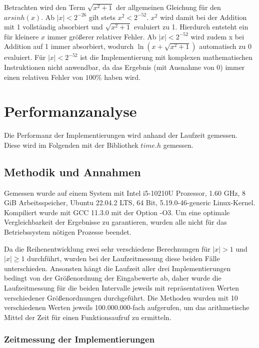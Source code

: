 \documentclass[course=erap] {aspdoc}
\begin{document}
    Betrachten wird den Term $\sqrt{x^2 + 1}$ der allgemeinen Gleichung für den $arsinh(x)$.
    Ab $|x|<2^{-26}$ gilt stets $x^2<2^{-52}$. $x^2$ wird damit bei der Addition mit 1 vollständig absorbiert und $\sqrt{x^2 + 1}$ evaluiert zu 1.
    Hierdurch entsteht ein für kleinere $x$ immer größerer relativer Fehler.
    Ab $|x|<2^{-52}$ wird zudem x bei Addition auf 1 immer absorbiert, wodurch $\ln{(x+\sqrt{x^2 + 1})}$ automatisch zu 0 evaluiert.
    Für $|x|<2^{-52}$ ist die Implementierung mit komplexen mathematischen Instruktionen nicht anwendbar, da das Ergebnis (mit Ausnahme von 0) immer einen relativen Fehler von $100\%$ haben wird.


    \section{Performanzanalyse}\label{sec:performanzanalyse}
    
    Die Performanz der Implementierungen wird anhand der Laufzeit gemessen.
    Diese wird im Folgenden mit der Bibliothek $time.h$ gemessen.

    \subsection{Methodik und Annahmen}\label{subsec:methodik-und-annahmen}
    
    Gemessen wurde auf einem System mit Intel i5-10210U Prozessor, 1.60 GHz, 8 GiB Arbeitsspeicher, Ubuntu 22.04.2 LTS, 64 Bit, 5.19.0-46-generic Linux-Kernel.
    Kompiliert wurde mit GCC 11.3.0 mit der Option -O3. Um eine optimale Vergleichbarkeit der Ergebnisse zu garantieren, wurden alle nicht für das Betriebssystem nötigen Prozesse beendet.

    Da die Reihenentwicklung zwei sehr verschiedene Berechnungen für $|x|>1$ und $|x|\geq 1$ durchführt, wurden bei der Laufzeitmessung diese beiden Fälle unterschieden.
    Ansonsten hängt die Laufzeit aller drei Implementierungen bedingt von der Größenordnung der Eingabewerte ab, daher wurde die Laufzeitmessung für die beiden Intervalle jeweils mit repräsentativen Werten verschiedener Größenordnungen durchgeführt.
    Die Methoden wurden mit 10 verschiedenen Werten jeweils 100.000.000-fach aufgerufen, um das arithmetische Mittel der Zeit für einen Funktionsaufruf zu ermitteln.

    \subsubsection{Zeitmessung der Implementierungen}
\end{document}
